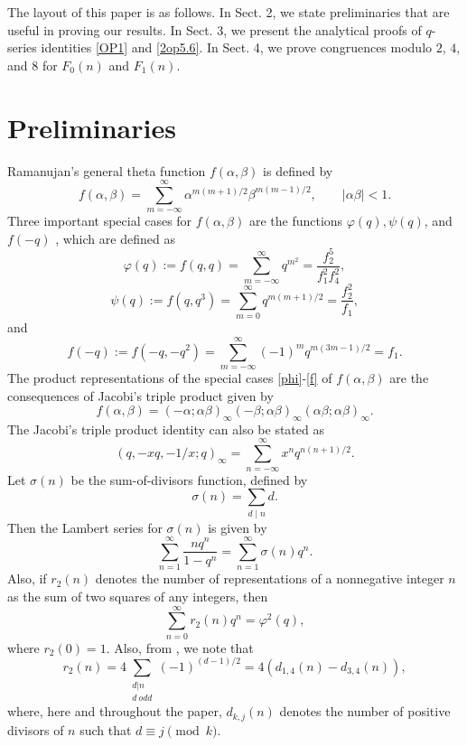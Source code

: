 \documentclass[12pt]{article}
\numberwithin{equation}{section}
\theoremstyle{definition}
\theoremstyle{remark}
\numberwithin{equation}{section}
\begin{document}
The layout of this paper is as follows. In Sect. 2, we state  preliminaries that are useful in proving our results. In Sect. 3, we present the analytical proofs of $q$-series identities \eqref{OP1} and \eqref{2op5.6}. In Sect. 4, we prove congruences modulo $2$, $4$, and $8$ for $F_0(n)$ and $F_1(n)$.


\section{Preliminaries}
Ramanujan's general theta function $f(\alpha, \beta)$ \cite[p. 34, (18.1)]{BBC} is defined by
$$
   f(\alpha, \beta) = \sum_{m=-\infty}^{\infty} \alpha^{m(m+1)/2} \beta^{m(m-1)/2}, \qquad |\alpha\beta| < 1.
$$
Three important special cases for $f(\alpha, \beta)$ are the functions $\varphi(q), \psi(q)$, and $f(-q)$ \cite[p. 35, Entry 18]{BBC}, which are defined as
\begin{equation}\label{phi}
    \varphi(q) := f(q, q) = \sum_{m=-\infty}^{\infty} q^{m^2} = \dfrac{f_2^5}{f_1^2f_4^2},
\end{equation}
\begin{equation}\label{psi}
    \psi(q) := f(q, q^3) = \sum_{m=0}^{\infty} q^{m(m+1)/2} = \dfrac{f_2^2}{f_1},
\end{equation}
and 
\begin{equation}\label{f}
    f(-q) := f(-q, -q^2) = \sum_{m=-\infty}^{\infty} (-1)^m q^{m(3m-1)/2} = f_1.
\end{equation}
The product representations of the  special cases \eqref{phi}-\eqref{f} of $f(\alpha, \beta)$ are the consequences of Jacobi's triple product \cite[ p. 35, Entry 19]{BBC} given by
$$f(\alpha, \beta) = (-\alpha; \alpha\beta)_\infty(-\beta; \alpha\beta)_\infty(\alpha\beta; \alpha\beta)_\infty.$$
The Jacobi's triple product identity can also be stated as \cite{gas}
$$
(q,-xq,-1/x;q)_\infty
=
\sum_{n=-\infty}^{\infty}x^nq^{n(n+1)/2}.
$$
Let $\sigma(n)$ be the sum-of-divisors function, defined by 
$$
\sigma(n)=\sum_{d\mid n}d.  
$$
Then the Lambert series for  $\sigma(n)$ is given by 
	$$
	\sum_{n=1}^\infty \dfrac{n q^{n}}{1 - q^{n}}=\sum_{n=1}^\infty \sigma(n)q^n.	
    $$
Also, if $r_2(n)$ denotes the number of representations of a nonnegative integer $n$ as the sum of two squares of any integers, then
\begin{equation}\label{gp}
	\sum_{n=0}^\infty r_2(n)q^n=\varphi^2(q),
	\end{equation}
    where $r_2(0)=1.$
Also, 
from \cite[Eq. (3.2.1), (3.2.2)]{BBC}, we note that
\begin{equation}\label{r_2}
    r_2(n)=4\sum_{\substack{d|n\\d ~odd}}(-1)^{(d-1)/2}=4(d_{1,4}(n)-d_{3,4}(n)),
\end{equation} where, here and throughout the paper, $d_{k,j}(n)$ denotes the number of positive divisors of $n$ such that $d\equiv j\pmod k$.
\end{document}
